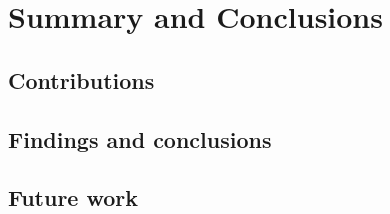 \documentclass[dissertation.tex]{subfiles}
\begin{document}
\chapter{Summary and Conclusions}



\section{Contributions}

\section{Findings and conclusions}

\section{Future work}

\printbibliography
\end{document}
